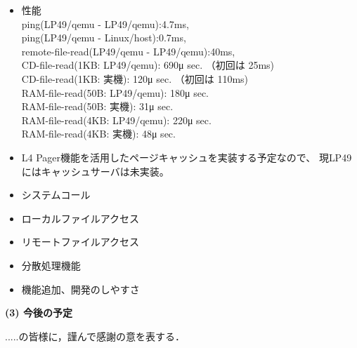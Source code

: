 \documentclass[draft]{ipsjpapers}
\begin{document}
\begin{itemize}
\item 性能 \\
  ping(LP49/qemu - LP49/qemu):4.7ms,  \\
  ping(LP49/qemu - Linux/host):0.7ms, \\

  remote-file-read(LP49/qemu - LP49/qemu):40ms, \\

  CD-file-read(1KB: LP49/qemu): 690μ sec. （初回は 25ms)\\
  CD-file-read(1KB: 実機): 120μ sec. （初回は 110ms)\\

  RAM-file-read(50B: LP49/qemu): 180μ sec. \\
  RAM-file-read(50B: 実機):   31μ sec. \\

  RAM-file-read(4KB: LP49/qemu): 220μ sec. \\
  RAM-file-read(4KB: 実機): 48μ sec. \\

\item L4 Pager機能を活用したページキャッシュを実装する予定なので、
現LP49にはキャッシュサーバは未実装。

\item システムコール

\item  ローカルファイルアクセス

\item リモートファイルアクセス

\item 分散処理機能

\item 機能追加、開発のしやすさ
\end{itemize}

{\bf (3) 今後の予定}




\begin{acknowledgment}
.....の皆様に，謹んで感謝の意を表する．
\end{acknowledgment}

\end{document}
